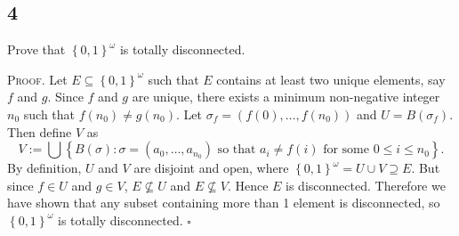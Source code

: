 \documentclass[12pt]{article}
\newcounter{ProofCounter}
\newenvironment{Proof}{\stepcounter{ProofCounter}\textsc{Proof.}}{\hfill$\square$}
\begin{document}
\subsection*{4}
\begin{tcolorbox}
  Prove that $\left\{ 0,1 \right\}^{\omega}$ is totally disconnected.
\end{tcolorbox}
\begin{Proof}
  Let $E \subseteq \left\{ 0,1 \right\}^{\omega}$ such that $E$ contains at least two
  unique elements, say $f$ and $g$. Since $f$ and $g$ are unique, there exists a minimum non-negative integer $n_0$ such that $f(n_0) \neq g(n_0)$.
  Let $\sigma_f = (f(0), \hdots, f(n_0))$ and $U = B(\sigma_{f})$. Then define $V$ as
  \[ V := \bigcup \left\{ B(\sigma) : \sigma = (a_0, \hdots, a_{n_0}) \text{ so that } a_i \neq f(i) \text{ for some } 0 \leq i \leq n_0 \right\}. \]
  By definition, $U$ and $V$ are disjoint and open, where $\left\{ 0,1 \right\}^{\omega} = U\cup V \supseteq E$. But since $f \in U$ and $g \in V$, $E
  \not\subseteq U$ and $E \not\subseteq V$. Hence $E$ is disconnected. Therefore we have shown that any subset containing more than 1 element is
  disconnected, so $\left\{ 0,1 \right\}^{\omega}$ is totally disconnected.
\end{Proof}

\newpage
\end{document}
